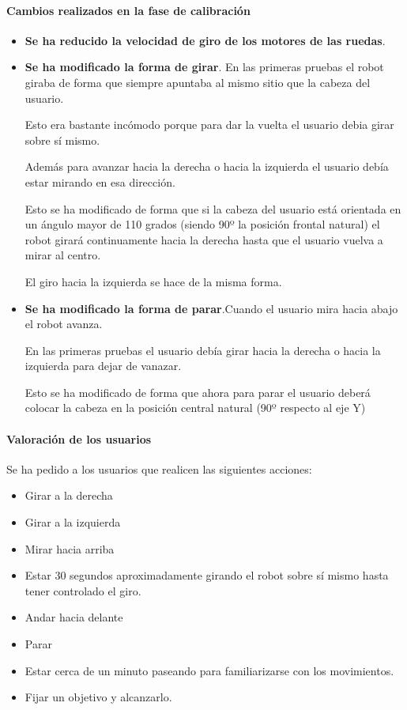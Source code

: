 \documentclass[twoside, 12pt]{epstfg}
\begin{document}
\paragraph{Cambios realizados en la fase de calibración}
\begin{itemize}
	\item \textbf{Se ha reducido la velocidad de giro de los motores de las ruedas}.
	
	\item \textbf{Se ha modificado la forma de girar}. En las primeras pruebas el robot giraba de forma que siempre apuntaba al mismo sitio que la cabeza del usuario.
	
	Esto era bastante incómodo porque para dar la vuelta el usuario debia girar sobre sí mismo.
	
	Además para avanzar hacia la derecha o hacia la izquierda el usuario debía estar mirando en esa dirección.
	
	Esto se ha modificado de forma que si la cabeza del usuario está orientada en un ángulo mayor de 110 grados (siendo 90º la posición frontal natural) el robot girará continuamente hacia la derecha hasta que el usuario vuelva a mirar al centro.
	
	El giro hacia la izquierda se hace de la misma forma.
	
	\item \textbf{Se ha modificado la forma de parar}.Cuando el usuario mira hacia abajo el robot avanza.
	
	En las primeras pruebas el usuario debía girar hacia la derecha o hacia la izquierda para dejar de vanazar.
	
	Esto se ha modificado de forma que ahora para parar el usuario deberá colocar la cabeza en la posición central natural (90º respecto al eje Y)
\end{itemize}

\paragraph{Valoración de los usuarios}

Se ha pedido a los usuarios que realicen las siguientes acciones:

\begin{itemize}
	\item Girar a la derecha
	\item Girar a la izquierda
	\item Mirar hacia arriba
	\item Estar 30 segundos aproximadamente girando el robot sobre sí mismo hasta tener controlado el giro.
	\item Andar hacia delante
	\item Parar
	\item Estar cerca de un minuto paseando para familiarizarse con los movimientos.
	\item Fijar un objetivo y alcanzarlo.
\end{itemize}
\end{document}
